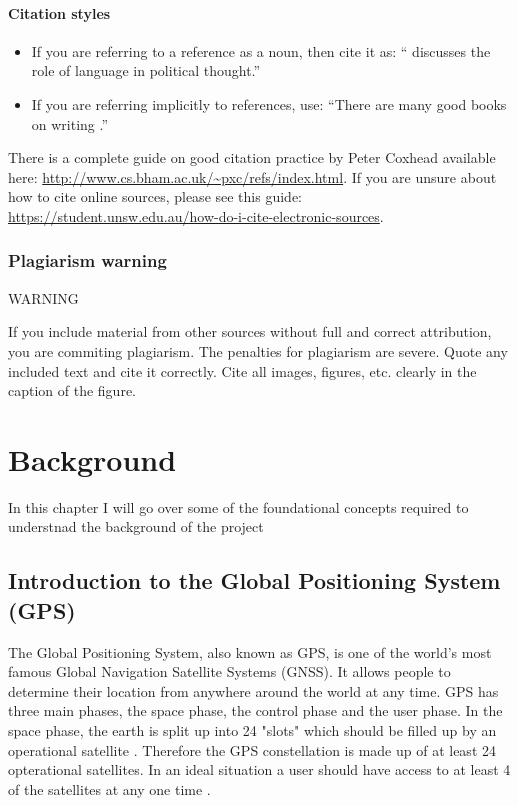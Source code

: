 \documentclass{l4proj}
\begin{document}
\subsubsection{Citation styles}

\begin{itemize}
\item If you are referring to a reference as a noun, then cite it as: ``\citet{Orw68} discusses the role of language in political thought.''
\item If you are referring implicitly to references, use: ``There are many good books on writing \citep{Orw68, Wil09, Pin15}.''
\end{itemize}

There is a complete guide on good citation practice by Peter Coxhead available here: \url{http://www.cs.bham.ac.uk/~pxc/refs/index.html}. 
If you are unsure about how to cite online sources, please see this guide: \url{https://student.unsw.edu.au/how-do-i-cite-electronic-sources}.

\subsection{Plagiarism warning}

\begin{highlight_title}{WARNING}
    
    If you include material from other sources without full and correct attribution, you are commiting plagiarism. The penalties for plagiarism are severe.
    Quote any included text and cite it correctly. Cite all images, figures, etc. clearly in the caption of the figure.
\end{highlight_title}


\chapter{Background}

In this chapter I will go over some of the foundational concepts required to understnad the background of the project

\section{Introduction to the Global Positioning System (GPS)}

The Global Positioning System, also known as GPS, is one of the world's most famous Global Navigation Satellite Systems (GNSS). It allows people to determine their
location from anywhere around the world at any time. GPS has three main phases, the space phase, the control phase and the user phase.
In the space phase, the earth is split up into 24 "slots" which should be filled up by an operational satellite \citep{spsStandard}. Therefore
the GPS constellation is made up of at least 24 opterational satellites. In an ideal situation a user should have access to at least 4 of the satellites
at any one time \citep{Rabbany2006}. 
\end{document}
